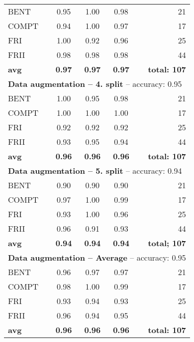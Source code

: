 \documentclass[fleqn,usenatbib]{mnras}
\begin{document}
\begin{table}
\begin{tabular}{lcccr}
		BENT & 0.95 & 1.00 &  0.98 & 21\\
		COMPT & 0.94 & 1.00 &  0.97  &17 \\
		FRI & 1.00 &  0.92 &  0.96 & 25\\
		FRII & 0.98 &0.98  & 0.98 & 44\\
		\hline
		\textbf{avg} & \textbf{0.97}  &  \textbf{0.97}& \textbf{0.97} & \textbf{total: 107}\\
		\hline
		\multicolumn{5}{l}{\textbf{Data augmentation -- 4. split} -- accuracy: 0.95}   \\ \hline
		BENT & 1.00 & 0.95 &  0.98 & 21\\
		COMPT & 1.00 & 1.00 &  1.00  &17 \\
		FRI & 0.92 &  0.92 &  0.92 & 25\\
		FRII & 0.93 & 0.95  & 0.94 & 44\\
		\hline
		\textbf{avg} & \textbf{0.96}   & \textbf{0.96}  &\textbf{0.96}   & \textbf{total: 107}\\
		\hline
		\multicolumn{5}{l}{\textbf{Data augmentation -- 5. split} -- accuracy: 0.94}   \\ \hline
		BENT & 0.90 & 0.90 &  0.90 & 21\\
		COMPT & 0.97 & 1.00 &  0.99  &17 \\
		FRI & 0.93 &  1.00 &  0.96 & 25\\
		FRII & 0.96 & 0.91  & 0.93 & 44\\
		\hline
		\textbf{avg} &  \textbf{0.94} & \textbf{0.94} &   \textbf{0.94}  & \textbf{total; 107}\\
		\hline \hline
	    \multicolumn{5}{l}{\textbf{Data augmentation -- Average} -- accuracy: 0.95 }  \\ \hline
		BENT & 0.96 & 0.97 & 0.97  & 21\\
		COMPT & 0.98 & 1.00 &  0.99 &17 \\
		FRI & 0.93 & 0.94 &  0.93 & 25\\
		FRII & 0.96 & 0.94  & 0.95 & 44\\
		\hline
		\textbf{avg} &  \textbf{0.96} & \textbf{0.96} &   \textbf{0.96}  & \textbf{total: 107}\\
		\hline 
	\end{tabular}
\end{table}
\end{document}
